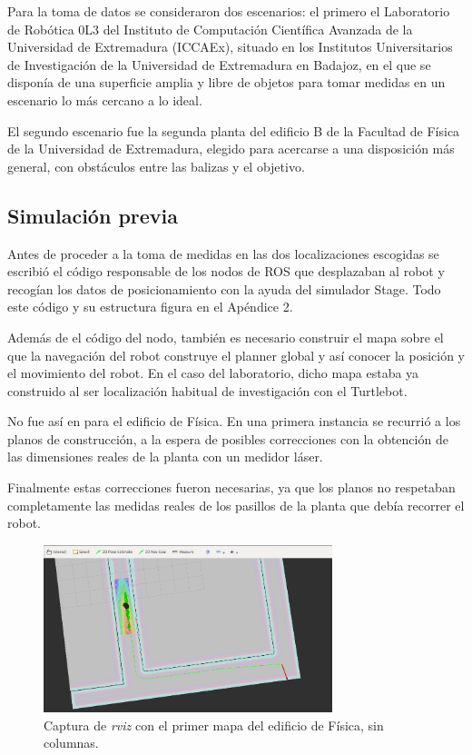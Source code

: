 Para la toma de datos se consideraron dos escenarios: el primero el Laboratorio de Robótica 0L3 del Instituto de Computación Científica Avanzada de la Universidad de Extremadura (ICCAEx), situado en los Institutos Universitarios de Investigación de la Universidad de Extremadura en Badajoz, en el que se disponía de una superficie amplia y libre de objetos para tomar medidas en un escenario lo más cercano a lo ideal.

El segundo escenario fue la segunda planta del edificio B de la Facultad de Física de la Universidad de Extremadura, elegido para acercarse a una disposición más general, con obstáculos entre las balizas y el objetivo.

\subsection{Simulación previa}

Antes de proceder a la toma de medidas en las dos localizaciones escogidas se escribió el código responsable de los nodos de ROS que desplazaban al robot y recogían los datos de posicionamiento con la ayuda del simulador Stage.
Todo este código y su estructura figura en el Apéndice 2.

Además de el código del nodo, también es necesario construir el mapa sobre el que la navegación del robot construye el planner global y así conocer la posición y el movimiento del robot.
En el caso del laboratorio, dicho mapa estaba ya construido al ser localización habitual de investigación con el Turtlebot.

No fue así en para el edificio de Física.
En una primera instancia se recurrió a los planos de construcción, a la espera de posibles correcciones con la obtención de las dimensiones reales de la planta con un medidor láser.

Finalmente estas correcciones fueron necesarias, ya que los planos no respetaban completamente las medidas reales de los pasillos de la planta que debía recorrer el robot.

\begin{figure}[H]
  \centering
  \includegraphics[width=0.75\textwidth]{pic/Trayectoria.png}
  \caption{Captura de \textit{rviz} con el primer mapa del edificio de Física, sin columnas.}
  \label{fig:plano_fisica}
\end{figure}

